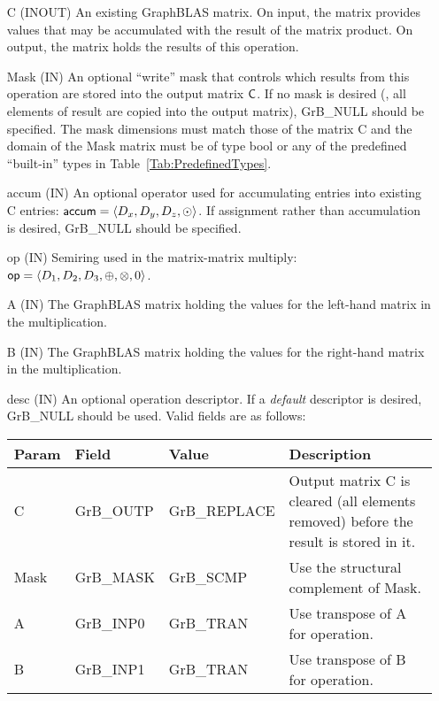 \begin{itemize}[leftmargin=1.1in]
    \item[{\sf C}]    ({\sf INOUT}) An existing GraphBLAS matrix. On
    input, the matrix provides values that may be accumulated with the
    result of the matrix product.   On output, the matrix holds the
    results of this operation.

    \item[{\sf Mask}] ({\sf IN}) An optional ``write'' mask that controls which
    results from this operation are stored into the output matrix
    ${\sf C}$.  If no mask is desired (\ie, all elements
    of result are copied into the output matrix), {\sf GrB\_NULL}
    should be specified. The mask dimensions must match those of the
    matrix {\sf C} and the domain of the {\sf Mask} matrix must be
    of type {\sf bool} or any of the predefined ``built-in'' types in
    Table~\ref{Tab:PredefinedTypes}.

    \item[{\sf accum}] ({\sf IN}) An optional operator used for accumulating
    entries into existing {\sf C} entries: ${\sf accum} = \langle D_x,
    D_y, D_z,\odot \rangle$. If assignment rather than accumulation is
    desired, {\sf GrB\_NULL} should be specified.

    \item[{\sf op}] ({\sf IN}) Semiring used in the matrix-matrix
    multiply: ${\sf op}=\langle D_1,D_2,D_3,\oplus,\otimes,0 \rangle$.

    \item[{\sf A}] ({\sf IN}) The GraphBLAS matrix holding the values
    for the left-hand matrix in the multiplication.

    \item[{\sf B}] ({\sf IN}) The GraphBLAS matrix holding the values
    for the right-hand matrix in the multiplication.

    \item[{\sf desc}] ({\sf IN}) An optional operation descriptor. If
    a \emph{default} descriptor is desired, {\sf GrB\_NULL} should be
    used. Valid fields are as follows:  \\

    \begin{tabular}{lllp{2.5in}}
    Param   & Field           & Value               & Description \\ \hline
    {\sf C}    & {\sf GrB\_OUTP} & {\sf GrB\_REPLACE}  & Output matrix {\sf C} is cleared (all elements removed) before the result is stored in it. \\
    {\sf Mask} & {\sf GrB\_MASK} & {\sf GrB\_SCMP}     & Use the structural complement of {\sf Mask}. \\
    {\sf A}    & {\sf GrB\_INP0} & {\sf GrB\_TRAN}     & Use transpose of {\sf A} for operation. \\
    {\sf B}    & {\sf GrB\_INP1} & {\sf GrB\_TRAN}     & Use transpose of {\sf B} for operation. \\
    \end{tabular}
\end{itemize}


